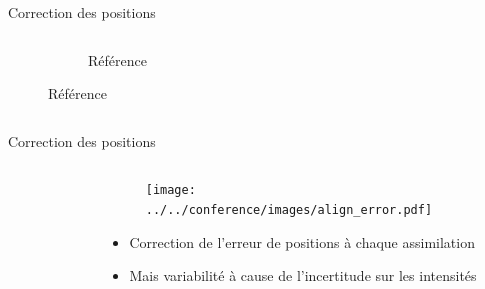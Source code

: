 \documentclass[aspectratio=169]{beamer} %
\begin{document}
\begin{frame}{Correction des positions}
\begin{columns}[c]
\begin{column}{0.55\textwidth}
\begin{figure}[c]
\begin{subfigure}{0.49\textwidth}
                    \caption*{\tiny Référence}
                \end{subfigure}
            \end{figure}
        \end{column}
    \end{columns}
    \vspace{-0.25cm}
\end{frame}

\begin{frame}{Correction des positions}
    \vspace{-0.5cm}
    \begin{columns}
        \begin{column}{0.5\textwidth}
            \begin{figure}
                \centering
            \end{figure}
        \end{column}
        \begin{column}{0.5\textwidth}
            \begin{figure}
                \centering
                \texttt{[image: ../../conference/images/align\_error.pdf]}
            \end{figure}
            \begin{itemize}
                \item Correction de l'erreur de positions à chaque assimilation
                \item Mais variabilité à cause de l'incertitude sur les intensités
            \end{itemize}
        \end{column}
    \end{columns}
\end{frame}
\end{document}
